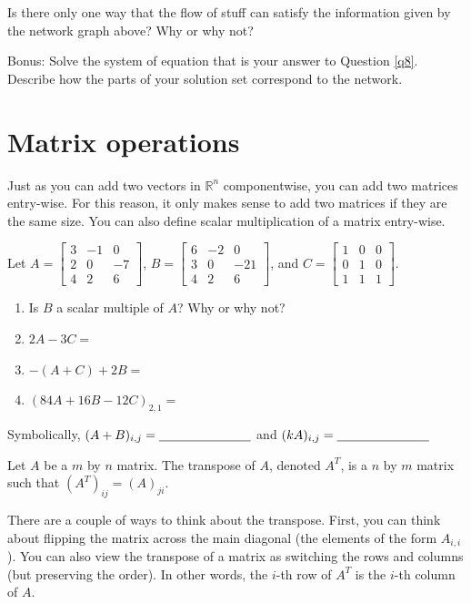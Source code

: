 \bq Is there only one way that the flow of stuff can satisfy the information given by the network graph above? Why or why not?
\eq

\bq Bonus: Solve the system of equation that is your answer to Question \ref{q8}. Describe how the parts of your solution set correspond to the network.
\eq

\section{Matrix operations}\label{mo}
Just as you can add two vectors in $\mathbb{R}^n$ componentwise, you can add two matrices entry-wise. For this reason, it only makes sense to add two matrices if they are the same size. You can also define scalar multiplication of a matrix entry-wise.

\bq Let $A=\begin{bmatrix} 3&-1&0 \\2&0&-7 \\ 4&2&6 \end{bmatrix}$, $B=\begin{bmatrix} 6&-2&0 \\3&0&-21 \\ 4&2&6 \end{bmatrix}$, \break and $C=\begin{bmatrix} 1&0&0 \\0&1&0\\1&1&1 \end{bmatrix}$.
\begin{enumerate}
\item Is $B$ a scalar multiple of $A$? Why or why not?
\item $2A-3C=$
\item $-(A+C)+2B=$
\item $(84A+16B-12C)_{2,1}=$
\end{enumerate}
\eq
\bq Symbolically, $(A+B)_{i,j}=\underline{\hspace{1.0in}}$ and $(k A)_{i,j}=\underline{\hspace{1.0in}}$
\eq
\begin{definition}
Let $A$ be a $m$ by $n$ matrix. The transpose of $A$, denoted $A^T$, is a $n$ by $m$ matrix such that $(A^T)_{ij}= (A)_{ji}$.
\end{definition}
There are a couple of ways to think about the transpose. First, you can think about flipping the matrix across the main diagonal (the elements of the form $A_{i,i}$). You can also view the transpose of a matrix as switching the rows and columns (but preserving the order). In other words, the $i$-th row of $A^T$ is the $i$-th column of $A$.

